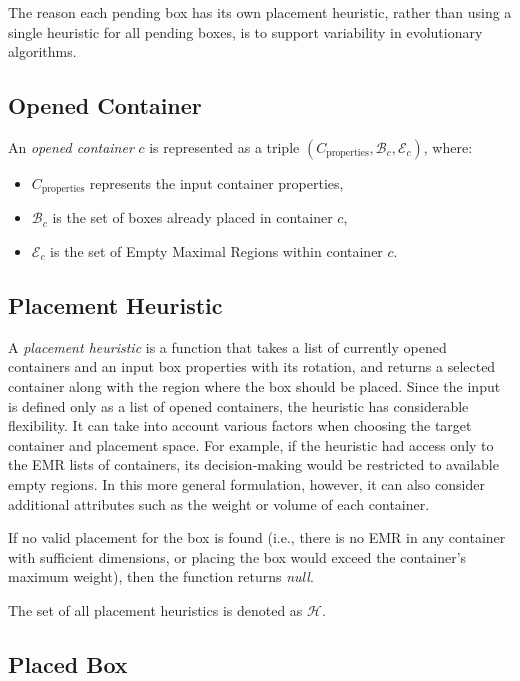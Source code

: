 The reason each pending box has its own placement heuristic, rather than using a single heuristic for all pending boxes, is to support variability in evolutionary algorithms.

\subsection{Opened Container}

An \emph{opened container} $c$ is represented as a triple $(C_\text{properties}, \mathcal{B}_c, \mathcal{E}_c)$, where:
\begin{itemize}
    \item $C_\text{properties}$ represents the input container properties,
    \item $\mathcal{B}_c$ is the set of boxes already placed in container $c$,
    \item $\mathcal{E}_c$ is the set of Empty Maximal Regions within container $c$.
\end{itemize}

\subsection{Placement Heuristic}

A \emph{placement heuristic} is a function that takes a list of currently opened containers and an input box properties with its rotation, 
and returns a selected container along with the region where the box should be placed.
Since the input is defined only as a list of opened containers, 
the heuristic has considerable flexibility. It can take into account various factors when choosing the target container and placement space. 
For example, if the heuristic had access only to the EMR lists of containers, 
its decision-making would be restricted to available empty regions. 
In this more general formulation, however, it can also consider additional attributes such as the weight or volume of each container.

If no valid placement for the box is found (i.e., there is no EMR in any container with sufficient dimensions, or placing the box would exceed the container's maximum weight), 
then the function returns \textit{null}.

The set of all placement heuristics is denoted as $\mathcal{H}$.


\subsection{Placed Box}


